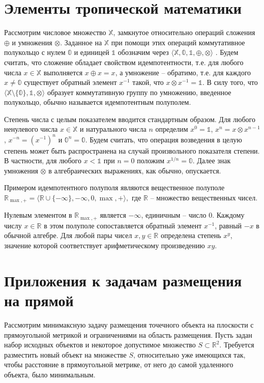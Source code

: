 \documentclass{spisok-article}
\begin{document}
\section{Элементы тропической математики}

Рассмотрим числовое множество $\mathbb{X}$, замкнутое относительно операций сложения $\oplus$ и умножения $\otimes$. Заданное на $\mathbb{X}$ при помощи этих операций коммутативное полукольцо с нулем $\mathbb{0}$ и единицей $\mathbb{1}$ обозначим через $\langle\mathbb{X},\mathbb{0},\mathbb{1},\oplus,\otimes\rangle$ . Будем считать, что сложение обладает свойством идемпотентности, т.е. для любого числа $x\in\mathbb{X}$ выполняется $x\oplus x = x$, а умножение -- обратимо, т.е. для каждого $x\ne\mathbb{0}$ существует обратный элемент $x^{-1}$ такой, что $x\otimes x^{-1}=\mathbb{1}$. В силу того, что $\langle \mathbb{X}\setminus\{\mathbb{0}\}, \mathbb{1}, \otimes \rangle$ образует коммутативную группу по умножению, введенное полукольцо, обычно называется идемпотентным полуполем.

Степень числа с целым показателем вводится стандартным образом. Для любого ненулевого числа $x\in\mathbb{X}$ и натурального числа $n$ определим $x^{0}=\mathbb{1}$, $x^{n} =x\otimes x^{n-1}$, $x^{-n}=(x^{-1})^{n}$ и $\mathbb{0}^{n}=\mathbb{0}$. Будем считать, что операция возведения в целую степень может быть распространена на случай произвольного показателя степени. В частности, для любого $x<\mathbb{1}$ при $n=0$ положим $x^{1/n}=\mathbb{0}$.
Далее знак умножения $\otimes$ в алгебраических выражениях, как обычно, опускается.

Примером идемпотентного полуполя являются вещественное полуполе
$
\mathbb{R}_{\max,+}=\langle\mathbb{R}\cup\{-\infty\},-\infty,0,\max,+\rangle,
$
где $\mathbb{R}$ -- множество вещественных чисел.

Нулевым элементом в $\mathbb{R}_{\max,+}$ является $-\infty$, единичным -- число $0$. Каждому числу $x\in\mathbb{R}$ в этом полуполе сопоставляется обратный элемент $x^{-1}$, равный $-x$ в обычной алгебре. Для любой пары чисел $x,y\in\mathbb{R}$ определена степень $x^{y}$, значение которой соответствует арифметическому произведению $xy$. 

\section{Приложения к задачам размещения на прямой}

Рассмотрим минимаксную задачу размещения точечного объекта на плоскости с прямоугольной метрикой и ограничениями на область размещения. Пусть задан набор исходных объектов и некоторое допустимое множество $S\subset\mathbb{R}^{2}$. Требуется разместить новый объект на множестве $S$, относительно уже имеющихся так, чтобы расстояние в прямоугольной метрике, от него до самой удаленного объекта, было минимальным.
\end{document}
